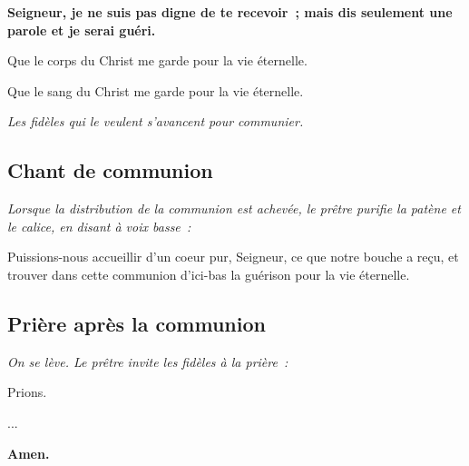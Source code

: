{\bf Seigneur, je ne suis pas digne de te recevoir~;                            
mais dis seulement une parole et je serai guéri.}

Que le corps du Christ me garde pour la vie éternelle.

Que le sang du Christ me garde pour la vie éternelle.


\emph{Les fidèles qui le veulent s'avancent pour communier.}

\subsection*{Chant de communion}

\emph{Lorsque la distribution de la communion est achevée, le prêtre            
purifie la patène et le calice, en disant à voix basse~:}

Puissions-nous accueillir d'un coeur pur, Seigneur, ce que notre
bouche a reçu, et trouver dans cette communion d'ici-bas la guérison
pour la vie éternelle.

\subsection*{Prière après la communion}

\emph{On se lève. Le prêtre invite les fidèles à la prière~:}

Prions.

...

{\bf Amen.}
